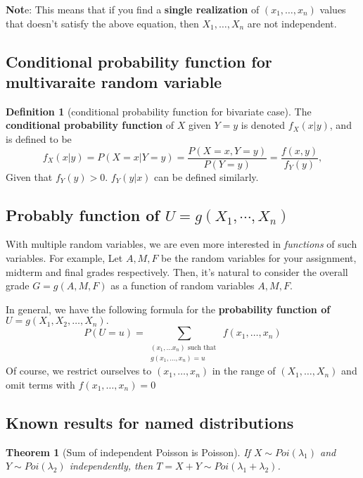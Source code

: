 \documentclass[
]{book}
\newtheorem{theorem}{Theorem}[chapter]
\theoremstyle{definition}
\newtheorem{definition}{Definition}[chapter]
\theoremstyle{definition}
\theoremstyle{definition}
\theoremstyle{definition}
\theoremstyle{remark}
\begin{document}
\textbf{Not}e: This means that if you find a \textbf{single realization} of \((x_1, \ldots, x_n)\) values that doesn't satisfy the above equation, then \(X_1, \ldots, X_n\) are not independent.

\subsection{Conditional probability function for multivaraite random variable}\label{conditional-probability-function-for-multivaraite-random-variable}

\begin{definition}[conditional probability function for bivariate case]
The \textbf{conditional probability function} of \(X\) given \(Y=y\) is denoted \(f_X(x|y)\), and is defined to be
\[
f_X(x|y)= P(X=x|Y=y) = \frac{P(X=x,Y=y)}{P(Y=y)} = \frac{f(x,y)}{f_Y(y)},
\]
Given that \(f_Y(y) > 0\).
\(f_Y(y|x)\) can be defined similarly.
\end{definition}

\subsection{\texorpdfstring{Probably function of \(U=g(X_1,\cdots,X_n)\)}{Probably function of U=g(X\_1,\textbackslash cdots,X\_n)}}\label{probably-function-of-ugx_1cdotsx_n}

With multiple random variables, we are even more interested in \emph{functions} of such variables. For example, Let \(A, M, F\) be the random variables for your assignment, midterm and final grades respectively. Then, it's natural to consider the overall grade \(G = g(A,M,F)\) as a function of random variables \(A, M, F\).

In general, we have the following formula for the \textbf{probability function of \(U = g(X_1, X_2, \ldots, X_n).\)}
\[
P(U = u) = \sum_{\substack{(x_1, \ldots x_n) \text{ such that }\\ g(x_1, \ldots, x_n) = u}} f(x_1, \ldots, x_n)
\]
Of course, we restrict ourselves to \((x_1,\dots,x_n)\) in the range of \((X_1,\dots,X_n)\) and omit terms with \(f(x_1, \ldots, x_n)=0\)

\subsection{Known results for named distributions}\label{known-results-for-named-distributions}

\begin{theorem}[Sum of independent Poisson is Poisson]
If \(X \sim Poi(\lambda_1)\) and \(Y \sim Poi(\lambda_2)\) independently, then \(T = X + Y \sim Poi(\lambda_1 + \lambda_2)\).
\end{theorem}
\end{document}
